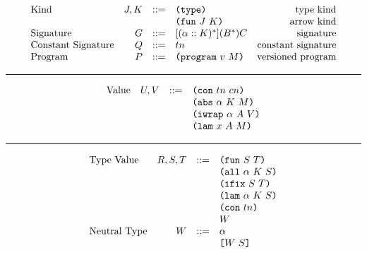 \documentclass[../plutus-core-specification.tex]{subfiles}
\begin{document}
\begin{minipage}{\linewidth}
\[\begin{array}{lrclr}
        \textrm{Kind}             & J,K    & ::= & \texttt{(} \texttt{type} \texttt{)}{}                   & \textrm{type kind}\\
                                  &        &     & \texttt{(} \texttt{fun} ~ J ~ K \texttt{)}                & \textrm{arrow kind}\\
        \textrm{Signature}        & G      & ::= & [(\alpha :: K)^*](B^*)C     & \textrm{signature}\\
        \textrm{Constant Signature}   & Q      & ::= & tn                     & \textrm{constant signature}\\
        \textrm{Program}          & P      & ::= & \texttt{(} \texttt{program} ~ v ~ M \texttt{)}             & \textrm{versioned program}

    \end{array}\]
    \label{fig:grammar}
\end{minipage}

\medskip
\hrule
\medskip

\begin{minipage}{\linewidth}
    \centering
    \[\begin{array}{lrcl}
        \textrm{Value}            & U, V   & ::= & \texttt{(} \texttt{con} ~ tn ~ cn \texttt{)}         \\
                                  &        &     & \texttt{(} \texttt{abs} ~ \alpha ~ K ~ M \texttt{)}   \\
                                  &        &     & \texttt{(} \texttt{iwrap} ~ \alpha ~ A ~ V \texttt{)} \\
                                  &        &     & \texttt{(} \texttt{lam} ~ x ~ A ~ M \texttt{)}
    \end{array}\]
    \label{fig:values}
\end{minipage}

\medskip
\hrule
\medskip

\begin{minipage}{\linewidth}
    \centering
    \[\begin{array}{lrcl}
        \textrm{Type Value}       & R,S,T  & ::= & \texttt{(} \texttt{fun} ~ S ~ T \texttt{)}          \\
                                  &        &     & \texttt{(} \texttt{all} ~ \alpha ~ K ~ S \texttt{)}  \\
                                  &        &     & \texttt{(} \texttt{ifix} ~ S ~ T \texttt{)}          \\
                                  &        &     & \texttt{(} \texttt{lam} ~ \alpha ~ K ~ S \texttt{)}  \\
                                  &        &     & \texttt{(} \texttt{con} ~ tn \texttt{)}           \\
                                  &        &     & W                    \\
        \textrm{Neutral Type}     & W      & ::= & \alpha               \\
                                  &        &     & \texttt{[} W ~ S \texttt{]}          \\
    \end{array}\]
    \label{fig:type-values}
\end{minipage}
\end{document}
